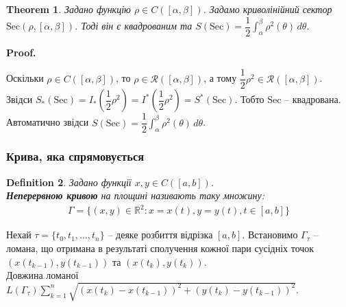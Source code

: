 \documentclass[a4paper, 10pt]{article}
\makeatletter
\def\huge{\displaystyle}
\def\qed{$\blacksquare$}
\theoremstyle{theoremdd}
\newtheorem{theorem}{Theorem}[subsection]
\theoremstyle{theoremdd}
\theoremstyle{theoremdd}
\newtheorem{definition}[theorem]{Definition}
\theoremstyle{theoremdd}
\theoremstyle{theoremdd}
\theoremstyle{theoremdd}
\theoremstyle{theoremdd}
\theoremstyle{theoremdd}
\theoremstyle{theoremdd}
\renewenvironment{proof}[1][Proof.\\]{\par
\pushQED{\hfill \qed}%
\normalfont \topsep6\p@\@plus6\p@\relax
\trivlist
\item\relax
{\bfseries
#1\@addpunct{.}}\hspace\labelsep\ignorespaces
}{%
\popQED\endtrivlist\@endpefalse
}
\makeatother
\begin{document}
\begin{theorem}
Задано функцію $\rho \in C([\alpha,\beta])$. Задамо криволінійний сектор $\text{Sec}(\rho, [\alpha,\beta])$. Тоді він є квадрованим та $S(\text{Sec}) = \dfrac{1}{2} \huge\int_\alpha^\beta \rho^2(\theta) \,d\theta$.
\end{theorem}

\begin{proof}
Оскільки $\rho \in C([\alpha,\beta])$, то $\rho \in \mathcal{R}([\alpha,\beta])$, а тому $\dfrac{1}{2}\rho^2 \in \mathcal{R}([\alpha,\beta])$. Звідси $S_*(\text{Sec}) = I_*\left( \dfrac{1}{2} \rho^2 \right) = I^*\left( \dfrac{1}{2} \rho^2 \right) = S^*(\text{Sec})$. Тобто $\text{Sec}$ -- квадрована.\\
Автоматично звідси $S(\text{Sec}) = \dfrac{1}{2} \huge\int_\alpha^\beta \rho^2(\theta) \, d\theta$.
\end{proof}

\subsubsection{Крива, яка спрямовується}
\begin{definition}
Задано функції $x,y \in C([a,b])$.\\
\textbf{Неперервною кривою} на площині називають таку множину:
\begin{align*}
\Gamma = \{ (x,y) \in \mathbb{R}^2 : x = x(t), y = y(t), t \in [a,b] \}
\end{align*}
\end{definition}
Нехай $\tau = \{t_0,t_1,\dots,t_n\}$ -- деяке розбиття відрізка $[a,b]$. Встановимо $\Gamma_\tau$ -- ломана, що отримана в результаті сполучення кожної пари сусідніх точок $(x(t_{k-1}), y(t_{k-1}))$ та $(x(t_{k}),y(t_{k}))$.\\
Довжина ломаної $L(\Gamma_\tau) \huge\sum_{k=1}^n \sqrt{(x(t_{k})-x(t_{k-1}))^2 + (y(t_{k})-y(t_{k-1}))^2}$.
\begin{figure}[H]
\centering
{}
\end{figure}
\end{document}
